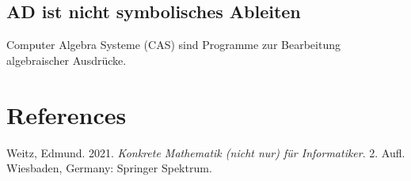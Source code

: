 \documentclass[
  letterpaper,
  DIV=11]{scrreprt}
\newlength{\cslhangindent}
\newlength{\cslentryspacingunit} %
\newenvironment{CSLReferences}[2] %
 {%
  \setlength{\parindent}{0pt}
  \ifodd #1
  \let\oldpar\par
  \def\par{\hangindent=\cslhangindent\oldpar}
  \fi
  \setlength{\parskip}{#2\cslentryspacingunit}
 }%
 {}
\theoremstyle{definition}
\theoremstyle{remark}
\begin{document}
\hypertarget{ad-ist-nicht-symbolisches-ableiten}{%
\section{AD ist nicht symbolisches
Ableiten}\label{ad-ist-nicht-symbolisches-ableiten}}

Computer Algebra Systeme (CAS) sind Programme zur Bearbeitung
algebraischer Ausdrücke.


\hypertarget{references}{%
\chapter*{References}\label{references}}

\hypertarget{refs}{}
\begin{CSLReferences}{1}{0}
\leavevmode{}%
Weitz, Edmund. 2021. \emph{Konkrete Mathematik (nicht nur) f{ü}r
Informatiker}. 2. Aufl. Wiesbaden, Germany: Springer Spektrum.

\end{CSLReferences}
\end{document}
